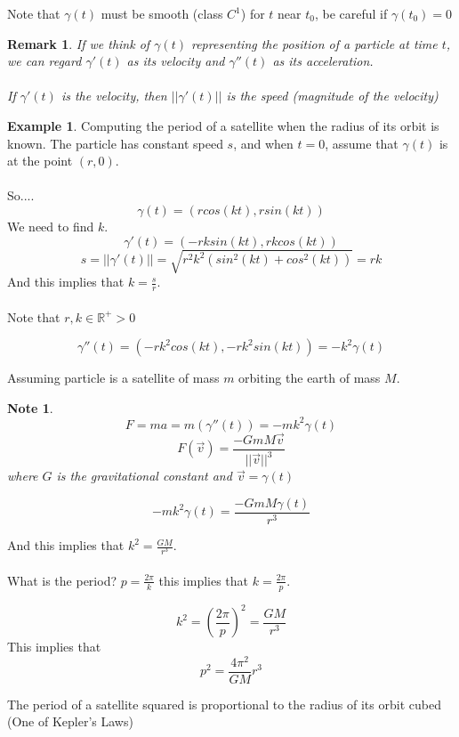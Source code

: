 \documentclass[12pt]{article}
\theoremstyle{plain}
\newtheorem*{remark}{Remark}
\newtheorem*{note}{Note}
\theoremstyle{definition}
\newtheorem{example}[theorem]{Example}
\begin{document}
Note that $\gamma (t)$ must be smooth (class $C^1$) for $t$ near $t_0$, be careful if $\gamma (t_0) = 0$

\begin{remark}
	If we think of $\gamma (t)$ representing the position of a particle at time $t$, we can regard $\gamma ' (t)$ as its velocity and $\gamma '' (t)$ as its acceleration.\\
	\\
	If $\gamma ' (t)$ is the velocity, then $||\gamma ' (t)||$ is the speed (magnitude of the velocity)
\end{remark}

\begin{example}
	Computing the period of a satellite when the radius of its orbit is known. The particle has constant speed $s$, and when $t=0$, assume that $\gamma (t)$ is at the point $(r,0)$.\\
	\\
	So....
	$$\gamma(t) = (rcos(kt), rsin(kt))$$
	We need to find $k$.
	$$\gamma ' (t) = (-rksin(kt), rkcos(kt))$$
	$$s = ||\gamma ' (t)|| = \sqrt{r^2 k^2 (sin^2 (kt) + cos^2 (kt))} = rk$$
	And this implies that $k = \frac{s}{r}$.\\
	\\
	Note that $r,k \in \mathbb{R}^+ > 0$
	
	$$\gamma '' (t) = (-rk^2 cos(kt), -rk^2 sin(kt)) = -k^2 \gamma (t)$$
	
	Assuming particle is a satellite of mass $m$ orbiting the earth of mass $M$.
	
	\begin{note}
		$$F = ma = m(\gamma '' (t)) = -mk^2 \gamma (t)$$
		$$F(\vec{v}) = \frac{-G m M \vec{v}}{||\vec{v}||^3}$$
		where $G$ is the gravitational constant and $\vec{v} = \gamma (t)$
	\end{note}
	
	$$-mk^2 \gamma (t) = \frac{-G m M \gamma (t)}{r^3}$$
	
	And this implies that $k^2 = \frac{GM}{r^3}$.\\
	\\
	What is the period? $p = \frac{2\pi}{k}$ this implies that $k = \frac{2\pi}{p}$.
	
	$$k^2 = (\frac{2\pi}{p})^2 = \frac{GM}{r^3}$$
	This implies that
	$$p^2 = \frac{4 \pi^2}{GM} r^3$$
	
	The period of a satellite squared is proportional to the radius of its orbit cubed (One of Kepler's Laws)

\end{example}
\end{document}
